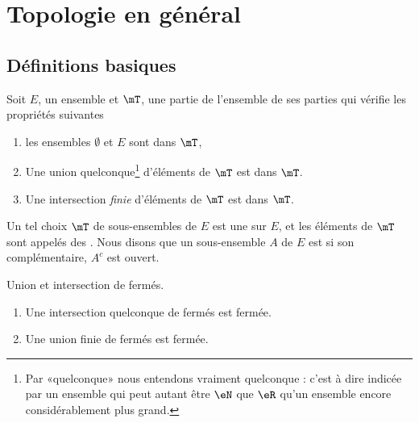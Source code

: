 
\section{Topologie en général}

\subsection{Définitions basiques}

\begin{definition}		\label{DefTopologieGene}
Soit $E$, un ensemble et $\mT$, une partie de l'ensemble de ses parties qui vérifie les propriétés suivantes
\begin{enumerate}
\item
les ensembles $\emptyset$ et $E$ sont dans $\mT$,
\item
    Une union quelconque\footnote{Par «quelconque» nous entendons vraiment quelconque : c'est à dire indicée par un ensemble qui peut autant être \( \eN\) que \( \eR\)
    qu'un ensemble encore considérablement plus grand.} d'éléments de \( \mT\) est dans \( \mT\).
\item
    Une intersection \emph{finie} d'éléments de \( \mT\) est dans \( \mT\).

\end{enumerate}
Un tel choix $\mT$ de sous-ensembles de $E$ est une   sur $E$, et les éléments de $\mT$ sont appelés des . Nous disons que un sous-ensemble $A$ de $E$ est  si son complémentaire, $A^c$ est ouvert.
\end{definition}

\begin{lemma}   \label{LemQYUJwPC}
    Union et intersection de fermés.
    \begin{enumerate}
        \item
            Une intersection quelconque de fermés est fermée.
        \item       \label{ItemKJYVooMBmMbG}
            Une union finie de fermés est fermée.
    \end{enumerate}
\end{lemma}

